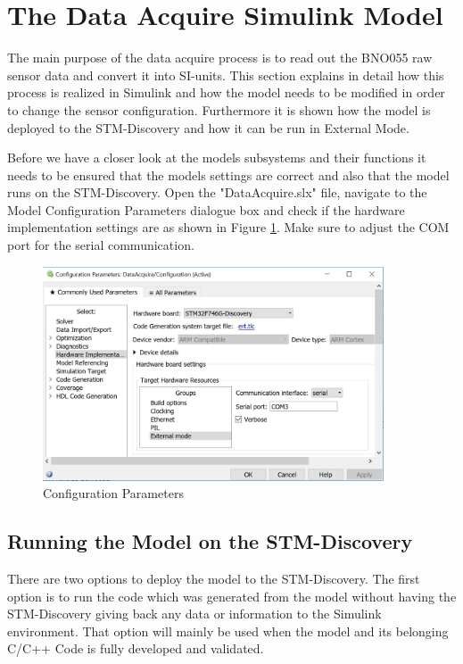 \documentclass[a4paper]{article}
\begin{document}
\section{The Data Acquire Simulink Model}

The main purpose of the data acquire process is to read out the BNO055 raw sensor data and convert it into SI-units. This section explains in detail how this process is realized in Simulink and how the model needs to be modified in order to change the sensor configuration. Furthermore it is shown how the model is deployed to the STM-Discovery and how it can be run in External Mode. 

\bigskip

Before we have a closer look at the models subsystems and their functions it needs to be ensured that the models settings are correct and also that the model runs on the STM-Discovery. Open the "DataAcquire.slx" file, navigate to the Model Configuration Parameters dialogue box and check if the hardware implementation settings are as shown in Figure \ref{configparams}. Make sure to adjust the COM port for the serial communication.  

\begin{figure}[htb]
	\centering
	\includegraphics*[trim=0mm 0mm 0mm 0mm,width=0.9\textwidth]{configparameters}
	\caption{Configuration Parameters}
	\label{configparams}
\end{figure}


\subsection{Running the Model on the STM-Discovery} 

There are two options to deploy the model to the STM-Discovery. The first option is to run the code which was generated from the model without having the STM-Discovery giving back any data or information to the Simulink environment. That option will mainly be used when the model and its belonging C/C++ Code is fully developed and validated.
\end{document}
